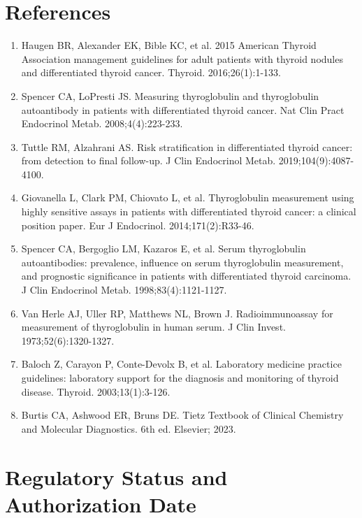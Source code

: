 \section*{References}
\begin{enumerate}
  \item Haugen BR, Alexander EK, Bible KC, et al. 2015 American Thyroid Association management guidelines for adult patients with thyroid nodules and differentiated thyroid cancer. Thyroid. 2016;26(1):1-133.
  \item Spencer CA, LoPresti JS. Measuring thyroglobulin and thyroglobulin autoantibody in patients with differentiated thyroid cancer. Nat Clin Pract Endocrinol Metab. 2008;4(4):223-233.
  \item Tuttle RM, Alzahrani AS. Risk stratification in differentiated thyroid cancer: from detection to final follow-up. J Clin Endocrinol Metab. 2019;104(9):4087-4100.
  \item Giovanella L, Clark PM, Chiovato L, et al. Thyroglobulin measurement using highly sensitive assays in patients with differentiated thyroid cancer: a clinical position paper. Eur J Endocrinol. 2014;171(2):R33-46.
  \item Spencer CA, Bergoglio LM, Kazaros E, et al. Serum thyroglobulin autoantibodies: prevalence, influence on serum thyroglobulin measurement, and prognostic significance in patients with differentiated thyroid carcinoma. J Clin Endocrinol Metab. 1998;83(4):1121-1127.
  \item Van Herle AJ, Uller RP, Matthews NL, Brown J. Radioimmunoassay for measurement of thyroglobulin in human serum. J Clin Invest. 1973;52(6):1320-1327.
  \item Baloch Z, Carayon P, Conte-Devolx B, et al. Laboratory medicine practice guidelines: laboratory support for the diagnosis and monitoring of thyroid disease. Thyroid. 2003;13(1):3-126.
  \item Burtis CA, Ashwood ER, Bruns DE. Tietz Textbook of Clinical Chemistry and Molecular Diagnostics. 6th ed. Elsevier; 2023.
\end{enumerate}

\clearpage
\section*{Regulatory Status and Authorization Date}

\clearpage
